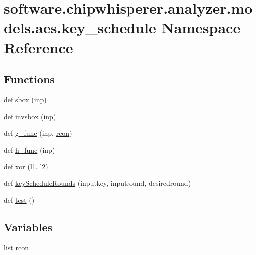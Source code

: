 \hypertarget{namespacesoftware_1_1chipwhisperer_1_1analyzer_1_1models_1_1aes_1_1key__schedule}{}\section{software.\+chipwhisperer.\+analyzer.\+models.\+aes.\+key\+\_\+schedule Namespace Reference}
\label{namespacesoftware_1_1chipwhisperer_1_1analyzer_1_1models_1_1aes_1_1key__schedule}
\subsection*{Functions}
\begin{DoxyCompactItemize}
\item 
def \hyperlink{namespacesoftware_1_1chipwhisperer_1_1analyzer_1_1models_1_1aes_1_1key__schedule_ab403ea833b4e70350f2fb974d3d2adf3}{sbox} (inp)
\item 
def \hyperlink{namespacesoftware_1_1chipwhisperer_1_1analyzer_1_1models_1_1aes_1_1key__schedule_ac3f402095947072f7133ff28c1b0e0ed}{invsbox} (inp)
\item 
def \hyperlink{namespacesoftware_1_1chipwhisperer_1_1analyzer_1_1models_1_1aes_1_1key__schedule_a8e40a05b996028d50872e21019fcd197}{g\+\_\+func} (inp, \hyperlink{namespacesoftware_1_1chipwhisperer_1_1analyzer_1_1models_1_1aes_1_1key__schedule_acf2e930c08018b7cb8ecc9d19ccb48d1}{rcon})
\item 
def \hyperlink{namespacesoftware_1_1chipwhisperer_1_1analyzer_1_1models_1_1aes_1_1key__schedule_a246af38d68dab40d5e973f9f6a92f285}{h\+\_\+func} (inp)
\item 
def \hyperlink{namespacesoftware_1_1chipwhisperer_1_1analyzer_1_1models_1_1aes_1_1key__schedule_a5bf493afb3110461a9cc19465b3e6094}{xor} (l1, l2)
\item 
def \hyperlink{namespacesoftware_1_1chipwhisperer_1_1analyzer_1_1models_1_1aes_1_1key__schedule_aa0e0cef2bfba47599cd9fdaed40e4c5c}{key\+Schedule\+Rounds} (inputkey, inputround, desiredround)
\item 
def \hyperlink{namespacesoftware_1_1chipwhisperer_1_1analyzer_1_1models_1_1aes_1_1key__schedule_a738dfc04cf684936da826dcde7488983}{test} ()
\end{DoxyCompactItemize}
\subsection*{Variables}
\begin{DoxyCompactItemize}
\item 
list \hyperlink{namespacesoftware_1_1chipwhisperer_1_1analyzer_1_1models_1_1aes_1_1key__schedule_acf2e930c08018b7cb8ecc9d19ccb48d1}{rcon}
\end{DoxyCompactItemize}


